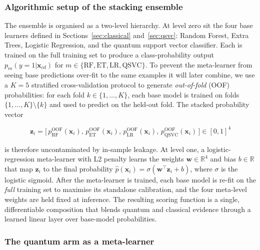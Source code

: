 \documentclass[twocolumn,10pt]{article}
\begin{document}
\subsubsection*{Algorithmic setup of the stacking ensemble}

The ensemble is organised as a two-level hierarchy. At level zero sit the four base learners defined in Sections~\ref{sec:classical} and~\ref{sec:qsvc}: Random Forest, Extra Trees, Logistic Regression, and the quantum support vector classifier. Each is trained on the full training set to produce a class-probability output $p_{m}(y=1|\mathbf{x}_{cd})$ for $m \in \{\mathrm{RF},\mathrm{ET},\mathrm{LR},\mathrm{QSVC}\}$. To prevent the meta-learner from seeing base predictions over-fit to the same examples it will later combine, we use a $K=5$ stratified cross-validation protocol to generate \emph{out-of-fold} (OOF) probabilities: for each fold $k \in \{1,\dots,K\}$, each base model is trained on folds $\{1,\dots,K\}\setminus\{k\}$ and used to predict on the held-out fold. The stacked probability vector

\begin{equation}
\mathbf{z}_i = \bigl[\,p_{\mathrm{RF}}^{\mathrm{OOF}}(\mathbf{x}_i),\, p_{\mathrm{ET}}^{\mathrm{OOF}}(\mathbf{x}_i),\, p_{\mathrm{LR}}^{\mathrm{OOF}}(\mathbf{x}_i),\, p_{\mathrm{QSVC}}^{\mathrm{OOF}}(\mathbf{x}_i)\,\bigr] \in [0,1]^{4}
\label{eq:stack}
\end{equation}

is therefore uncontaminated by in-sample leakage. At level one, a logistic-regression meta-learner with L2 penalty learns the weights $\mathbf{w} \in \mathbb{R}^{4}$ and bias $b \in \mathbb{R}$ that map $\mathbf{z}_i$ to the final probability $\hat{p}(\mathbf{x}_i) = \sigma(\mathbf{w}^{\top}\mathbf{z}_i + b)$, where $\sigma$ is the logistic sigmoid. After the meta-learner is trained, each base model is re-fit on the \emph{full} training set to maximise its standalone calibration, and the four meta-level weights are held fixed at inference. The resulting scoring function is a single, differentiable composition that blends quantum and classical evidence through a learned linear layer over base-model probabilities.

\subsubsection*{The quantum arm as a meta-learner}
\end{document}
